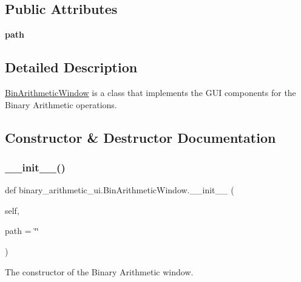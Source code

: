 \subsection*{Public Attributes}
\begin{DoxyCompactItemize}
\item 
\mbox{\label{classbinary__arithmetic__ui_1_1_bin_arithmetic_window_a33ebbcf56fc1406f4569f8db705c5dab}} 
{\bfseries path}
\end{DoxyCompactItemize}


\subsection{Detailed Description}
\hyperlink{classbinary__arithmetic__ui_1_1_bin_arithmetic_window}{Bin\+Arithmetic\+Window} is a class that implements the G\+UI components for the Binary Arithmetic operations. 

\subsection{Constructor \& Destructor Documentation}
\mbox{\label{classbinary__arithmetic__ui_1_1_bin_arithmetic_window_a0511ad3ac87d51b48420f7dc4c4dd35d}} 
\subsubsection{\texorpdfstring{\+\_\+\+\_\+init\+\_\+\+\_\+()}{\_\_init\_\_()}}
{\footnotesize\ttfamily def binary\+\_\+arithmetic\+\_\+ui.\+Bin\+Arithmetic\+Window.\+\_\+\+\_\+init\+\_\+\+\_\+ (\begin{DoxyParamCaption}\item[{}]{self,  }\item[{}]{path = {\ttfamily \char`\"{}\char`\"{}} }\end{DoxyParamCaption})}



The constructor of the Binary Arithmetic window. 

